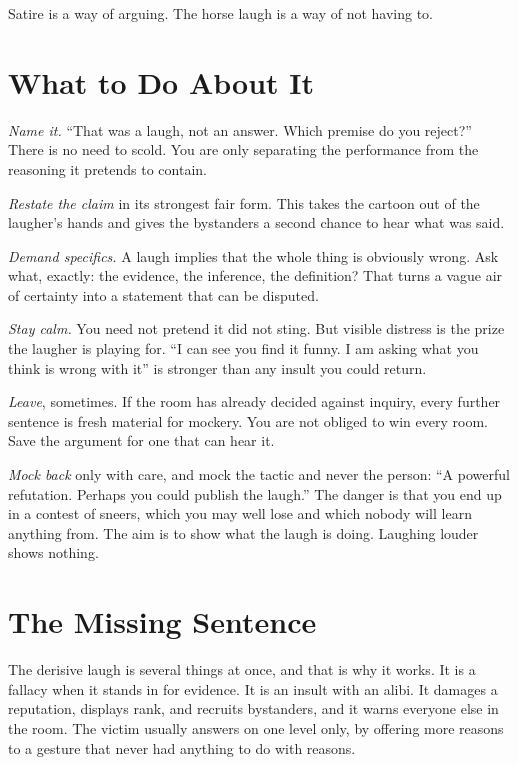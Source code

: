 \documentclass[12pt,a4paper]{book}
\begin{document}
Satire is a way of arguing. The horse laugh is a way of not having to.

\section{What to Do About It}

\emph{Name it.} ``That was a laugh, not an answer. Which premise do you reject?'' There is no need to scold. You are only separating the performance from the reasoning it pretends to contain.

\emph{Restate the claim} in its strongest fair form. This takes the cartoon out of the laugher's hands and gives the bystanders a second chance to hear what was said.

\emph{Demand specifics.} A laugh implies that the whole thing is obviously wrong. Ask what, exactly: the evidence, the inference, the definition? That turns a vague air of certainty into a statement that can be disputed.

\emph{Stay calm.} You need not pretend it did not sting. But visible distress is the prize the laugher is playing for. ``I can see you find it funny. I am asking what you think is wrong with it'' is stronger than any insult you could return.

\emph{Leave}, sometimes. If the room has already decided against inquiry, every further sentence is fresh material for mockery. You are not obliged to win every room. Save the argument for one that can hear it.

\emph{Mock back} only with care, and mock the tactic and never the person: ``A powerful refutation. Perhaps you could publish the laugh.'' The danger is that you end up in a contest of sneers, which you may well lose and which nobody will learn anything from. The aim is to show what the laugh is doing. Laughing louder shows nothing.

\section{The Missing Sentence}

The derisive laugh is several things at once, and that is why it works. It is a fallacy when it stands in for evidence. It is an insult with an alibi. It damages a reputation, displays rank, and recruits bystanders, and it warns everyone else in the room. The victim usually answers on one level only, by offering more reasons to a gesture that never had anything to do with reasons.
\end{document}
